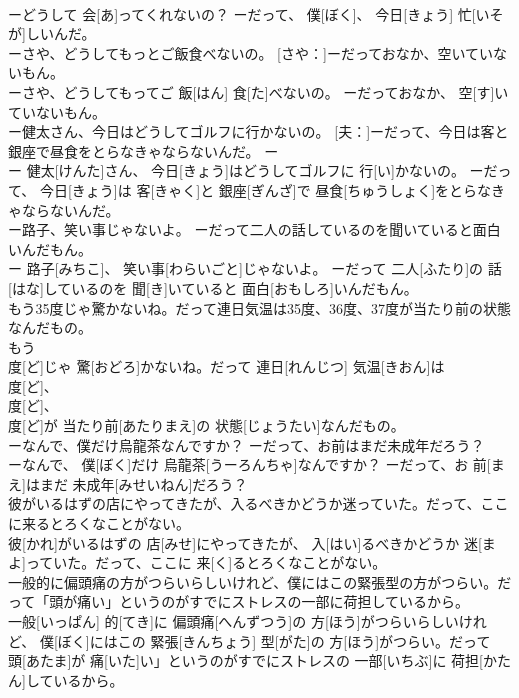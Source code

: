 \documentclass[8pt]{extreport}
\begin{document}
\begin{CJK}{UTF8}{min}
\\	ーどうして 会[あ]ってくれないの？ ーだって、 僕[ぼく]、 今日[きょう] 忙[いそが]しいんだ。
\\	[母：]ーさや、どうしてもっとご飯食べないの。 [さや：]ーだっておなか、空いていないもん。	
\\	ーさや、どうしてもってご 飯[はん] 食[た]べないの。 ーだっておなか、 空[す]いていないもん。
\\	[妻：]ー健太さん、今日はどうしてゴルフに行かないの。 [夫：]ーだって、今日は客と銀座で昼食をとらなきゃならないんだ。	ー
\\	ー 健太[けんた]さん、 今日[きょう]はどうしてゴルフに 行[い]かないの。 ーだって、 今日[きょう]は 客[きゃく]と 銀座[ぎんざ]で 昼食[ちゅうしょく]をとらなきゃならないんだ。
\\	ー路子、笑い事じゃないよ。 ーだって二人の話しているのを聞いていると面白いんだもん。	
\\	ー 路子[みちこ]、 笑い事[わらいごと]じゃないよ。 ーだって 二人[ふたり]の 話[はな]しているのを 聞[き]いていると 面白[おもしろ]いんだもん。
\\	もう35度じゃ驚かないね。だって連日気温は35度、36度、37度が当たり前の状態なんだもの。	
\\	もう 
\\	度[ど]じゃ 驚[おどろ]かないね。だって 連日[れんじつ] 気温[きおん]は 
\\	度[ど]、 
\\	度[ど]、 
\\	度[ど]が 当たり前[あたりまえ]の 状態[じょうたい]なんだもの。
\\	ーなんで、僕だけ烏龍茶なんですか？ ーだって、お前はまだ未成年だろう？	
\\	ーなんで、 僕[ぼく]だけ 烏龍茶[うーろんちゃ]なんですか？ ーだって、お 前[まえ]はまだ 未成年[みせいねん]だろう？
\\	彼がいるはずの店にやってきたが、入るべきかどうか迷っていた。だって、ここに来るとろくなことがない。	
\\	彼[かれ]がいるはずの 店[みせ]にやってきたが、 入[はい]るべきかどうか 迷[まよ]っていた。だって、ここに 来[く]るとろくなことがない。
\\	一般的に偏頭痛の方がつらいらしいけれど、僕にはこの緊張型の方がつらい。だって「頭が痛い」というのがすでにストレスの一部に荷担しているから。	
\\	一般[いっぱん] 的[てき]に 偏頭痛[へんずつう]の 方[ほう]がつらいらしいけれど、 僕[ぼく]にはこの 緊張[きんちょう] 型[がた]の 方[ほう]がつらい。だって
\\	頭[あたま]が 痛[いた]い」というのがすでにストレスの 一部[いちぶ]に 荷担[かたん]しているから。

\end{CJK}
\end{document}
